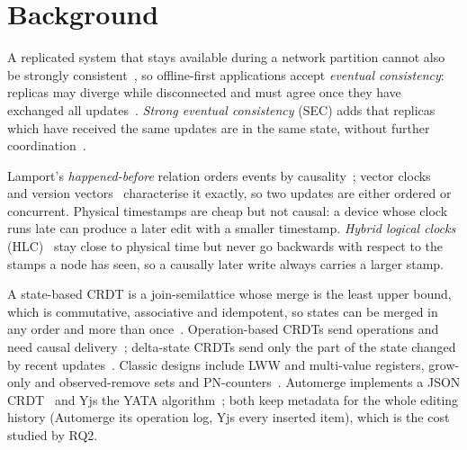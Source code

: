 \section{Background}\label{sec:background}

A replicated system that stays available during a network partition cannot also be strongly
consistent~\cite{gilbert2002cap}, so offline-first applications accept \emph{eventual consistency}: replicas may
diverge while disconnected and must agree once they have exchanged all updates~\cite{vogels2009eventually,
burckhardt2014principles}. \emph{Strong eventual consistency} (SEC) adds that replicas which have received the same
updates are in the same state, without further coordination~\cite{shapiro2011crdt}.

Lamport's \emph{happened-before} relation orders events by causality~\cite{lamport1978time}; vector
clocks~\cite{fidge1988timestamps,mattern1989virtual} and version vectors~\cite{parker1983detection} characterise it
exactly, so two updates are either ordered or concurrent. Physical timestamps are cheap but not causal: a device whose
clock runs late can produce a later edit with a smaller timestamp. \emph{Hybrid logical clocks}
(HLC)~\cite{kulkarni2014hlc} stay close to physical time but never go backwards with respect to the stamps a node has
seen, so a causally later write always carries a larger stamp.

A state-based CRDT is a join-semilattice whose merge is the least upper bound, which is commutative, associative and
idempotent, so states can be merged in any order and more than once~\cite{shapiro2011crdt,shapiro2011comprehensive}.
Operation-based CRDTs send operations and need causal delivery~\cite{baquero2014opbased}; delta-state CRDTs send only
the part of the state changed by recent updates~\cite{almeida2018delta}. Classic designs include LWW and multi-value
registers, grow-only and observed-remove sets and PN-counters~\cite{preguica2018overview}. Automerge implements a JSON
CRDT~\cite{kleppmann2017json} and Yjs the YATA algorithm~\cite{nicolaescu2016yjs}; both keep metadata for the whole
editing history (Automerge its operation log, Yjs every inserted item), which is the cost studied by RQ2.
